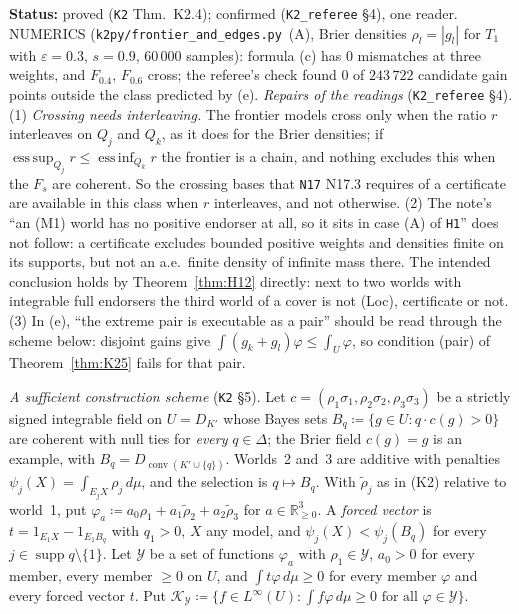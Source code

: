 \documentclass[11pt]{article}
\theoremstyle{definition}
\theoremstyle{remark}
\newcommand{\R}{\mathbb R}
\newcommand{\co}{\operatorname{conv}}
\newcommand{\supp}{\operatorname{supp}}
\newcommand{\src}[1]{\texttt{#1}}
\newcommand{\status}[1]{\par\smallskip\noindent\textbf{Status:} #1\par\smallskip}
\begin{document}
\status{proved (\src{K2} Thm.~K2.4); confirmed (\src{K2\_referee} \S4), one reader. NUMERICS (\src{k2py/frontier\_and\_edges.py}~(A), Brier densities $\rho_l=|g_l|$ for $T_1$ with $\varepsilon=0.3$, $s=0.9$, $60\,000$ samples): formula (c) has 0 mismatches at three weights, and $F_{0.4}$, $F_{0.6}$ cross; the referee's check found 0 of $243\,722$ candidate gain points outside the class predicted by (e). \emph{Repairs of the readings} (\src{K2\_referee} \S4). (1) \emph{Crossing needs interleaving.} The frontier models cross only when the ratio $r$ interleaves on $Q_j$ and $Q_k$, as it does for the Brier densities; if $\operatorname{ess\,sup}_{Q_j}r\le\operatorname{ess\,inf}_{Q_k}r$ the frontier is a chain, and nothing excludes this when the $F_s$ are coherent. So the crossing bases that \src{N17} N17.3 requires of a certificate are available in this class when $r$ interleaves, and not otherwise. (2) The note's ``an (M1) world has no positive endorser at all, so it sits in case (A) of \src{H1}'' does not follow: a certificate excludes bounded positive weights and densities finite on its supports, but not an a.e.\ finite density of infinite mass there. The intended conclusion holds by Theorem~\ref{thm:H12} directly: next to two worlds with integrable full endorsers the third world of a cover is not (Loc), certificate or not. (3) In (e), ``the extreme pair is executable as a pair'' should be read through the scheme below: disjoint gains give $\int(g_k+g_l)\varphi\le\int_U\varphi$, so condition (pair) of Theorem~\ref{thm:K25} fails for that pair.}

\emph{A sufficient construction scheme} (\src{K2} \S5). Let $c=(\rho_1\sigma_1,\rho_2\sigma_2,\rho_3\sigma_3)$ be a strictly signed integrable field on $U=D_{K'}$ whose Bayes sets $B_q\coloneqq\{g\in U:q\cdot c(g)>0\}$ are coherent with null ties for \emph{every} $q\in\Delta$; the Brier field $c(g)=g$ is an example, with $B_q=D_{\co(K'\cup\{q\})}$. Worlds~2 and~3 are additive with penalties $\psi_j(X)=\int_{E_jX}\rho_j\,d\mu$, and the selection is $q\mapsto B_q$. With $\tilde\rho_j$ as in (K2) relative to world~1, put $\varphi_a\coloneqq a_0\rho_1+a_1\tilde\rho_2+a_2\tilde\rho_3$ for $a\in\R^3_{\ge0}$. A \emph{forced vector} is $t=1_{E_1X}-1_{E_1B_q}$ with $q_1>0$, $X$ any model, and $\psi_j(X)<\psi_j(B_q)$ for every $j\in\supp q\setminus\{1\}$. Let $\mathcal Y$ be a set of functions $\varphi_a$ with $\rho_1\in\mathcal Y$, $a_0>0$ for every member, every member $\ge0$ on $U$, and $\int t\varphi\,d\mu\ge0$ for every member $\varphi$ and every forced vector $t$. Put $\mathcal K_{\mathcal Y}\coloneqq\{f\in L^\infty(U):\int f\varphi\,d\mu\ge0\text{ for all }\varphi\in\mathcal Y\}$.
\end{document}
